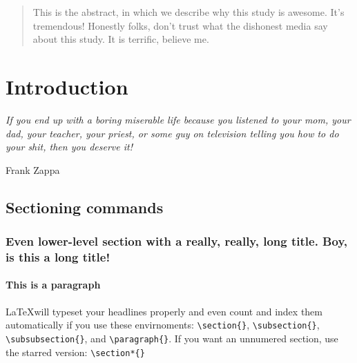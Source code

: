 

\begin{abstract} 
This is the abstract, in which we describe why this study is awesome. It's tremendous! Honestly folks, don't trust what the dishonest media say about this study. It is terrific, believe me. 
\end{abstract}  


\section{Introduction}

\epigraph{\textit{
	If you end up with a boring miserable life because you listened to your mom, your dad, your teacher, your priest, or some guy on television telling you how to do your shit, then you deserve it!}}
	{Frank Zappa}

\subsection{Sectioning commands}
\subsubsection[short title for toc]{Even lower-level section with a really, really, long title. Boy, is this a long title!}
\paragraph{This is a paragraph}

\LaTeX will typeset your headlines properly and even count and index them automatically if you use these envirnoments: \verb+\section{}+, \verb+\subsection{}+, \verb+\subsubsection{}+, and \verb+\paragraph{}+. If you want an unnumered section, use the starred version: \verb+\section*{}+




